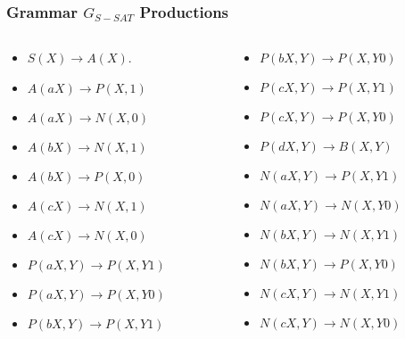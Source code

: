 \documentclass{beamer}
\begin{document}
\begin{frame}
    \frametitle{Grammar $G_{S-SAT}$ Productions}

    \begin{columns}
        \begin{column}{0.48\textwidth}
            \begin{itemize}
                \item $S(X)\to A(X)$.

                \item $A(aX)\to P(X,1)$
                \item $A(aX)\to N(X,0)$
                \item $A(bX)\to N(X,1)$
                \item $A(bX)\to P(X,0)$
                \item $A(cX)\to N(X,1)$
                \item $A(cX)\to N(X,0)$

                \item $P(aX,Y)\to P(X,Y1)$
                \item $P(aX,Y)\to P(X,Y0)$
                \item $P(bX,Y)\to P(X,Y1)$
            \end{itemize}
        \end{column}
        \begin{column}{0.48\textwidth}
            \begin{itemize}
                \item $P(bX,Y)\to P(X,Y0)$

                \item $P(cX,Y)\to P(X,Y1)$
                \item $P(cX,Y)\to P(X,Y0)$
                \item $P(dX,Y)\to B(X,Y)$

                \item $N(aX,Y)\to P(X,Y1)$
                \item $N(aX,Y)\to N(X,Y0)$
                \item $N(bX,Y)\to N(X,Y1)$
                \item $N(bX,Y)\to P(X,Y0)$
                \item $N(cX,Y)\to N(X,Y1)$
                \item $N(cX,Y)\to N(X,Y0)$
            \end{itemize}
        \end{column}
    \end{columns}
\end{frame}
\end{document}
